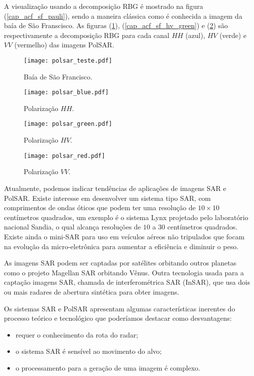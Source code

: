 A visualização usando a decomposição RBG é mostrado na figura (\ref{cap_acf_sf_pauli}), sendo a maneira clássica como é conhecida a imagem da baía de São Franscisco. As figuras (\ref{cap_acf_sf_hh_blue}), (\ref{cap_acf_sf_hv_green}) e (\ref{cap_acf_sf_vv_red}) são respectivamente a decomposição RBG para cada canal $HH$ (azul), $HV$ (verde) e $VV$ (vermelho) das imagens PolSAR. 

\begin{figure}[hbt]
\begin{minipage}[b]{0.450\linewidth}
\texttt{[image: polsar\_teste.pdf]}
\caption{Baía de São Francisco.}
\label{cap_acf_sf_pauli}
\end{minipage}\hfill
\begin{minipage}[b]{0.450\linewidth}
\texttt{[image: polsar\_blue.pdf]}
\caption{Polarização $HH$.}
\label{cap_acf_sf_hh_blue}
\end{minipage}
\end{figure}
%
\begin{figure}[hbt]
\begin{minipage}[b]{0.450\linewidth}
\texttt{[image: polsar\_green.pdf]}
\caption{Polarização $HV$.}
\label{cap_acf_sf_hv_green}
\end{minipage}\hfill
\begin{minipage}[b]{0.450\linewidth}
\texttt{[image: polsar\_red.pdf]}
\caption{Polarização $VV$.}
\label{cap_acf_sf_vv_red}
\end{minipage}
\end{figure}

Atualmente, podemos indicar tendências de aplicações de imagens SAR e PolSAR.  Existe interesse em desenvolver um sistema tipo SAR, com comprimentos de ondas óticos que podem ter uma resolução de $10\times 10$ centímetros quadrados, um exemplo é o  sistema Lynx projetado pelo laboratório nacional Sandia, o qual alcança resoluções de $10$ a $30$ centímetros quadrados. Existe ainda o mini-SAR para uso em veículos aéreos não tripulados que focam na evolução da micro-eletrônica para aumentar a eficiência e diminuir o peso. 

As imagens SAR podem ser captadas por satélites orbitando outros planetas como o projeto Magellan SAR orbitando Vênus.  Outra tecnologia usada para a captação  imagens SAR, chamada de interferométrica SAR (InSAR), que usa dois ou mais radares de abertura sintética para obter imagens.   
 
Os sistemas SAR e PolSAR apresentam algumas características inerentes do processo teórico e tecnológico que poderíamos destacar como desvantagens:
\begin{itemize}
\item requer o conhecimento da rota do radar;
\item o sistema SAR é sensível ao movimento do alvo;
\item o processamento para a geração de uma imagem é complexo.
\end{itemize}

